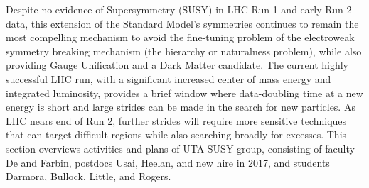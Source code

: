 Despite no evidence of Supersymmetry (SUSY) in LHC Run 1 and early Run
2 data, this extension of the Standard Model's symmetries continues to
remain the most compelling mechanism to avoid the fine-tuning problem
of the electroweak symmetry breaking mechanism (the hierarchy or
naturalness problem), while also providing Gauge Unification and a
Dark Matter candidate. The current highly successful LHC run, with a
significant increased center of mass energy and integrated luminosity,
provides a brief window where data-doubling time at a new energy is
short and large strides can be made in the search for new
particles. As LHC nears end of Run 2, further strides will require
more sensitive techniques that can target difficult regions while also
searching broadly for excesses. This section overviews activities and
plans of UTA SUSY group, consisting of faculty De and Farbin, postdocs
Usai, Heelan, and new hire in 2017, and students Darmora, Bullock,
Little, and Rogers.


